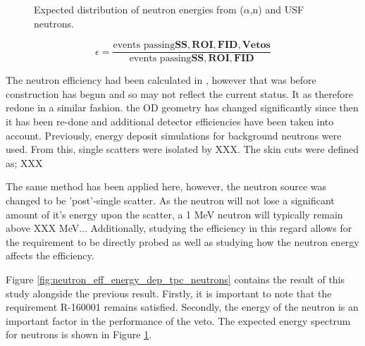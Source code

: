 \begin{figure}[!htbp]
    \centering
    \caption{Expected distribution of neutron energies from ($\alpha$,n) and USF neutrons.}
    \label{fig:simulation_background_neutron_energies}
\end{figure}


\begin{equation}
    \epsilon = \frac{\text{events passing}\mathbf{SS, ROI, FID, Vetos}}{\text{events passing}\mathbf{SS, ROI, FID}}
    \label{eq:neutron_efficiency}
\end{equation}

\par
The neutron efficiency had been calculated in \cite{sallyshaw_thesis_ref}, however that was before construction has begun and so may not reflect the current status.
It as therefore redone in a similar fashion.
the OD geometry has changed significantly since then it has been re-done and additional detector efficiencies have been taken into account.
Previously, energy deposit simulations for background neutrons were used. 
From this, single scatters were isolated by XXX.
The skin cuts were defined as; XXX


\par
The same method has been applied here, however, the neutron source was changed to be 'post'-single scatter. 
As the neutron will not lose a significant amount of it's energy upon the scatter, a 1 MeV neutron will typically remain above XXX MeV...
Additionally, studying the efficiency in this regard allows for the requirement to be directly probed as well as studying how the neutron energy affects the efficiency.

\par
Figure \ref{fig:neutron_eff_energy_dep_tpc_neutrons} contains the result of this study alongside the previous result.
Firstly, it is important to note that the requirement R-160001 remains satisfied.
Secondly, the energy of the neutron is an important factor in the performance of the veto.
The expected energy spectrum for neutrons is shown in Figure \ref{fig:simulation_background_neutron_energies}.


